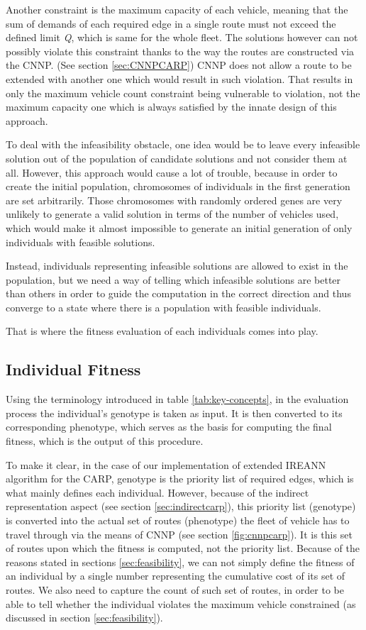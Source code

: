 \documentclass[twoside]{ctuthesis}
\theoremstyle{plain}
\theoremstyle{definition}
\theoremstyle{note}
\begin{document}
Another constraint is the maximum capacity of each vehicle, meaning that the sum of demands of each required edge in a single route must not exceed the defined limit \emph{Q}, which is same for the whole fleet. The solutions however can not possibly violate this constraint thanks to the way the routes are constructed via the CNNP. (See section \ref{sec:CNNPCARP}) CNNP does not allow a route to be extended with another one which would result in such violation. That results in only the maximum vehicle count constraint being vulnerable to violation, not the maximum capacity one which is always satisfied by the innate design of this approach.

To deal with the infeasibility obstacle, one idea would be to leave every infeasible solution out of the population of candidate solutions and not consider them at all. However, this approach would cause a lot of trouble, because in order to create the initial population, chromosomes of individuals in the first generation are set arbitrarily. Those chromosomes with randomly ordered genes are very unlikely to generate a valid solution in terms of the number of vehicles used, which would make it almost impossible to generate an initial generation of only individuals with feasible solutions.

Instead, individuals representing infeasible solutions are allowed to exist in the population, but we need a way of telling which infeasible solutions are better than others in order to guide the computation in the correct direction and thus converge to a state where there is a population with feasible individuals. 

That is where the fitness evaluation of each individuals comes into play.

\subsection{Individual Fitness}
\label{sec:fitness}
Using the terminology introduced in table \ref{tab:key-concepts}, in the evaluation process the individual's genotype is taken as input. It is then converted to its corresponding phenotype, which serves as the basis for computing the final fitness, which is the output of this procedure.

To make it clear, in the case of our implementation of extended IREANN algorithm for the CARP, genotype is the priority list of required edges, which is what mainly defines each individual. However, because of the indirect representation aspect (see section \ref{sec:indirectcarp}), this priority list (genotype) is converted into the actual set of routes (phenotype) the fleet of vehicle has to travel through via the means of CNNP (see section \ref{fig:cnnpcarp}). It is this set of routes upon which the fitness is computed, not the priority list. Because of the reasons stated in sections \ref{sec:feasibility}, we can not simply define the fitness of an individual by a single number representing the cumulative cost of its set of routes. We also need to capture the count of such set of routes, in order to be able to tell whether the individual violates the maximum vehicle constrained (as discussed in section \ref{sec:feasibility}). 
\end{document}
